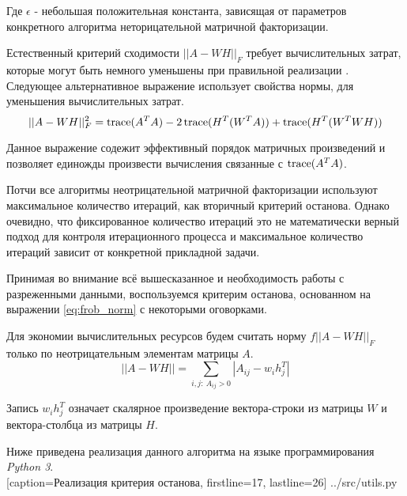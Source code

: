 Где $\epsilon$ - небольшая положительная константа, зависящая от параметров
конкретного алгоритма неторицательной матричной факторизации.

Естественный критерий сходимости $||A - WH||_F$ требует вычислительных затрат,
которые могут быть немного уменьшены при правильной реализации \cite{berry}.
Следующее альтернативное выражение использует свойства нормы, для уменьшения вычислительных затрат.
\begin{equation*}
  ||A - WH||^2_F = \operatorname{trace} (A^T A) - 2 \operatorname{trace}(H^T (W^T A)) + \operatorname{trace}(H^T (W^T W H))
\end{equation*}

Данное выражение содежит эффективный порядок матричных произведений и позволяет
единожды произвести вычисления связанные с $\operatorname{trace}(A^T A)$.

Потчи все алгоритмы неотрицательной матричной факторизации используют
максимальное количество итераций, как вторичный критерий останова.
Однако очевидно, что фиксированное количество итераций это не математически верный
подход для контроля итерационного процесса и максимальное количество итераций зависит от конкретной прикладной задачи.

Принимая во внимание всё вышесказанное и необходимость работы с разреженными данными,
воспользуемся критерим останова, основанном на выражении \eqref{eq:frob_norm} с некоторыми оговорками.

Для экономии вычислительных ресурсов будем считать норму $f|| A - WH ||_F$ только по неотрицательным элементам матрицы $A$.
\begin{equation*}
  ||A - WH|| = \sum\limits_{i, j: \ A_{ij} > 0}  | A_{ij} - w_i  h^T_j |
\end{equation*}

Запись $w_i h^T_j$ означает скалярное произведение вектора-строки из матрицы $W$ и вектора-столбца из матрицы $H$.

\newpage

Ниже приведена реализация данного алгоритма на языке программирования \textit{Python 3}.
\\


  [caption=Реализация критерия останова, firstline=17, lastline=26]
  {../src/utils.py} \label{code:als_nnls}
